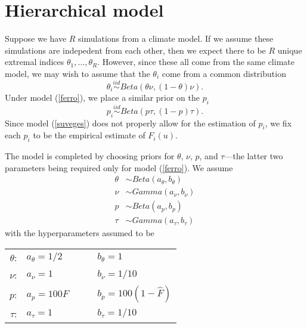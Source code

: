 \section{Hierarchical model}
\label{model}

Suppose we have $R$ simulations from a climate model. If we assume these simulations are indepedent from each other, then we expect there to be $R$ unique extremal indices $\theta_1,\ldots,\theta_R$. However, since these all come from the same climate model, we may wish to assume that the $\theta_i$ come from a common distribution
\[ \theta_i \overset{iid}\sim Beta\left(\theta\nu, (1-\theta)\nu\right). \]
Under model (\ref{ferro}), we place a similar prior on the $p_i$
\[ p_i \overset{iid}\sim Beta\left(p\tau, (1-p)\tau\right). \]
Since model (\ref{suveges}) does not properly allow for the estimation of $p_i$, we fix each $p_i$ to be the empirical estimate of $F_i(u)$.

The model is completed by choosing priors for $\theta$, $\nu$, $p$, and $\tau$---the latter two parameters being required only for model (\ref{ferro}). We assume
\begin{align*}
\theta &\sim Beta(a_\theta, b_\theta) \\
\nu &\sim Gamma(a_\nu, b_\nu) \\
p &\sim Beta(a_p, b_p) \\
\tau &\sim Gamma(a_\tau, b_\tau) 
\end{align*}
with the hyperparameters assumed to be
\begin{center}
\begin{tabular}{rlcl}
$\theta$: & $a_\theta = 1/2        $ &~~& $b_\theta = 1               $ \\
$   \nu$: & $   a_\nu = 1          $ &~~& $   b_\nu = 1/10            $ \\
$     p$: & $     a_p = 100 \hat{F}$ &~~& $     b_p = 100 (1-\hat{F}) $ \\
$  \tau$: & $  a_\tau = 1          $ &~~& $  b_\tau = 1/10            $ \\
\end{tabular}
\end{center}

